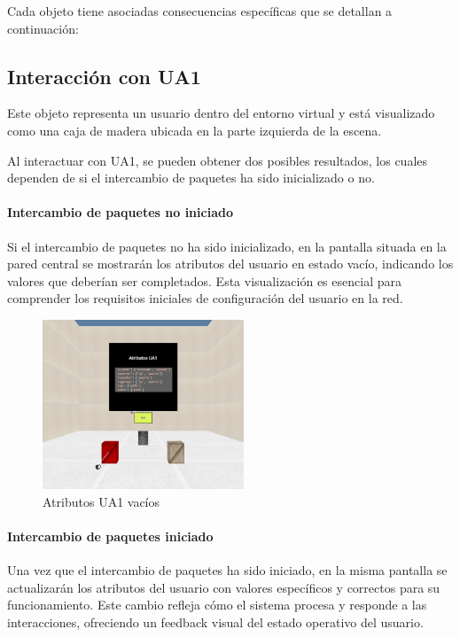 \documentclass[a4paper, 12pt]{book}
\begin{document}
Cada objeto tiene asociadas consecuencias específicas que se detallan a continuación:

\subsection{Interacción con UA1}
\label{subsec:objeto_ua1}

Este objeto representa un usuario dentro del entorno virtual y está visualizado como una caja 
de madera ubicada en la parte izquierda de la escena.

Al interactuar con UA1, se pueden obtener dos posibles resultados, los cuales dependen 
de si el intercambio de paquetes ha sido inicializado o no.

\paragraph{Intercambio de paquetes no iniciado}
Si el intercambio de paquetes no ha sido inicializado, en la pantalla situada en la pared central se mostrarán 
los atributos del usuario en estado vacío, indicando los valores que deberían ser completados. 
Esta visualización es esencial para comprender los requisitos iniciales de configuración del usuario en la red.

\begin{figure}
  \centering
  \includegraphics[width=6cm, keepaspectratio]{img/resultados/UA1_NoIniciado.png}
  \caption{Atributos UA1 vacíos}
  \label{fig:UA1_NoIniciado}
\end{figure}


\paragraph{Intercambio de paquetes iniciado}
Una vez que el intercambio de paquetes ha sido iniciado, en la misma pantalla se 
actualizarán los atributos del usuario con valores específicos y correctos para su funcionamiento. 
Este cambio refleja cómo el sistema procesa y responde a las interacciones, ofreciendo un feedback visual del estado operativo del usuario.
\end{document}

